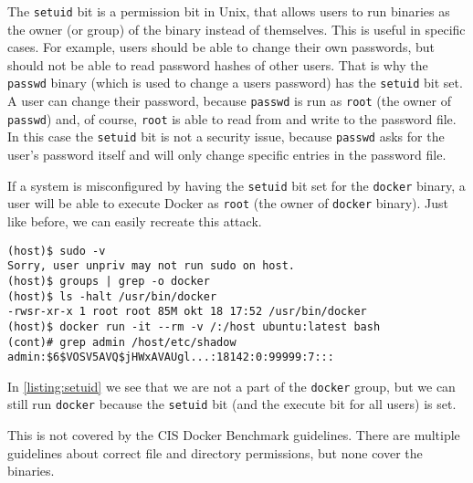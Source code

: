 \medskip

The \lstinline{setuid} bit is a permission bit in Unix, that allows users to run binaries as the owner (or group) of the binary instead of themselves.
This is useful in specific cases. For example, users should be able to change their own passwords, but should not be able to read password hashes of other users. That is why the \lstinline{passwd} binary (which is used to change a users password) has the \lstinline{setuid} bit set. A user can change their password, because \lstinline{passwd} is run as \lstinline{root} (the owner of \lstinline{passwd}) and, of course, \lstinline{root} is able to read from and write to the password file. In this case the \lstinline{setuid} bit is not a security issue, because \lstinline{passwd} asks for the user's password itself and will only change specific entries in the password file.

\medskip

If a system is misconfigured by having the \lstinline{setuid} bit set for the \lstinline{docker} binary, a user will be able to execute Docker as \lstinline{root} (the owner of \lstinline{docker} binary). Just like before, we can easily recreate this attack.

\begin{lstlisting}[caption={Docker \lstinline{setuid} exploit example.},captionpos=b, label={listing:setuid}]
(host)$ sudo -v
Sorry, user unpriv may not run sudo on host.
(host)$ groups | grep -o docker
(host)$ ls -halt /usr/bin/docker
-rwsr-xr-x 1 root root 85M okt 18 17:52 /usr/bin/docker
(host)$ docker run -it --rm -v /:/host ubuntu:latest bash
(cont)# grep admin /host/etc/shadow
admin:$6$VOSV5AVQ$jHWxAVAUgl...:18142:0:99999:7:::
\end{lstlisting}

In \autoref{listing:setuid} we see that we are not a part of the \lstinline{docker} group, but we can still run \lstinline{docker} because the \lstinline{setuid} bit (and the execute bit for all users) is set.

\medskip

This is not covered by the CIS Docker Benchmark guidelines. There are multiple guidelines about correct file and directory permissions, but none cover the binaries.
